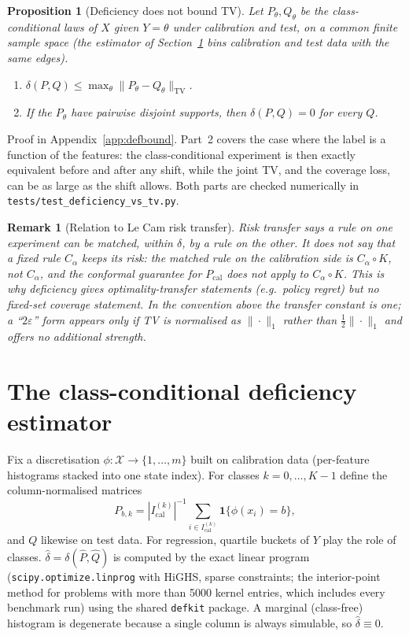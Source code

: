 \documentclass{article}
\newtheorem{proposition}[theorem]{Proposition}
\newtheorem{remark}{Remark}
\newcommand{\TV}[2]{\|#1 - #2\|_{\mathrm{TV}}}
\newcommand{\Pcal}{P_{\mathrm{cal}}}
\begin{document}
\begin{proposition}[Deficiency does not bound TV]
\label{prop:defbound}
Let $P_\theta,Q_\theta$ be the class-conditional laws of $X$ given $Y=\theta$
under calibration and test, on a common finite sample space (the estimator of
Section~\ref{sec:estimator} bins calibration and test data with the same edges).
\begin{enumerate}
  \item $\delta(P,Q)\le\max_\theta\TV{P_\theta}{Q_\theta}$.
  \item If the $P_\theta$ have pairwise disjoint supports, then
  $\delta(P,Q)=0$ for every $Q$.
\end{enumerate}
\end{proposition}
\noindent Proof in Appendix~\ref{app:defbound}. Part~2 covers the case where
the label is a function of the features: the class-conditional experiment is
then exactly equivalent before and after any shift, while the joint TV, and
the coverage loss, can be as large as the shift allows. Both parts are checked
numerically in \texttt{tests/test\_deficiency\_vs\_tv.py}.

\begin{remark}[Relation to Le Cam risk transfer]
Risk transfer says a rule on one experiment can be matched, within $\delta$, by
a rule on the other. It does not say that a \emph{fixed} rule $C_\alpha$ keeps
its risk: the matched rule on the calibration side is $C_\alpha\circ K$, not
$C_\alpha$, and the conformal guarantee for $\Pcal$ does not apply to
$C_\alpha\circ K$. This is why deficiency gives optimality-transfer statements
(e.g.\ policy regret) but no fixed-set coverage statement. In the
convention above the transfer constant is one; a ``$2\varepsilon$'' form
appears only if TV is normalised as $\|\cdot\|_1$ rather than
$\tfrac12\|\cdot\|_1$ and offers no additional strength.
\end{remark}

\section{The class-conditional deficiency estimator}
\label{sec:estimator}

Fix a discretisation $\phi:\mathcal X\to\{1,\dots,m\}$ built on calibration data
(per-feature histograms stacked into one state index). For classes
$k=0,\dots,K-1$ define the column-normalised matrices
\[
P_{b,k}=|I^{(k)}_{\mathrm{cal}}|^{-1}\sum_{i\in I^{(k)}_{\mathrm{cal}}}\mathbf 1\{\phi(x_i)=b\},
\]
and $Q$ likewise on test data. For regression, quartile buckets of $Y$ play the
role of classes. $\hat\delta=\delta(\hat P,\hat Q)$ is computed by the exact
linear program (\texttt{scipy.optimize.linprog} with HiGHS, sparse
constraints; the interior-point method for problems with more than 5000
kernel entries, which includes every benchmark run) using the shared
\texttt{defkit} package. A marginal (class-free) histogram is degenerate
because a single column is always simulable, so $\hat\delta\equiv0$.
\end{document}
